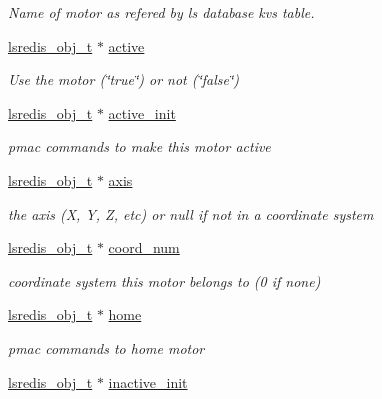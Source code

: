 \begin{DoxyCompactItemize}
\begin{DoxyCompactList}\small\item\em Name of motor as refered by ls database kvs table. \end{DoxyCompactList}\item 
\hyperlink{pgpmac_8h_ad449de06d02791adf2498d2a1e1f909c}{lsredis\-\_\-obj\-\_\-t} $\ast$ \hyperlink{structlspmac__motor__struct_aed4998885bcd5a2a30069637180f58e3}{active}
\begin{DoxyCompactList}\small\item\em Use the motor (\char`\"{}true\char`\"{}) or not (\char`\"{}false\char`\"{}) \end{DoxyCompactList}\item 
\hyperlink{pgpmac_8h_ad449de06d02791adf2498d2a1e1f909c}{lsredis\-\_\-obj\-\_\-t} $\ast$ \hyperlink{structlspmac__motor__struct_ac2a02f137e4a35db816bc728290d3558}{active\-\_\-init}
\begin{DoxyCompactList}\small\item\em pmac commands to make this motor active \end{DoxyCompactList}\item 
\hyperlink{pgpmac_8h_ad449de06d02791adf2498d2a1e1f909c}{lsredis\-\_\-obj\-\_\-t} $\ast$ \hyperlink{structlspmac__motor__struct_a7437ef16c2dce65bde4dda1ea00e9df3}{axis}
\begin{DoxyCompactList}\small\item\em the axis (X, Y, Z, etc) or null if not in a coordinate system \end{DoxyCompactList}\item 
\hyperlink{pgpmac_8h_ad449de06d02791adf2498d2a1e1f909c}{lsredis\-\_\-obj\-\_\-t} $\ast$ \hyperlink{structlspmac__motor__struct_a5614e003272e8323f8809bf7b6559532}{coord\-\_\-num}
\begin{DoxyCompactList}\small\item\em coordinate system this motor belongs to (0 if none) \end{DoxyCompactList}\item 
\hyperlink{pgpmac_8h_ad449de06d02791adf2498d2a1e1f909c}{lsredis\-\_\-obj\-\_\-t} $\ast$ \hyperlink{structlspmac__motor__struct_a6dc1ceab86687f741d4c4a574501959c}{home}
\begin{DoxyCompactList}\small\item\em pmac commands to home motor \end{DoxyCompactList}\item 
\hyperlink{pgpmac_8h_ad449de06d02791adf2498d2a1e1f909c}{lsredis\-\_\-obj\-\_\-t} $\ast$ \hyperlink{structlspmac__motor__struct_ab329ce9b277eca9984c18417dece7bf7}{inactive\-\_\-init}

\end{DoxyCompactItemize}
